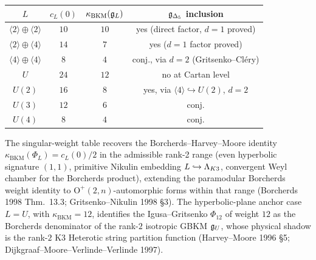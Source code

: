 \begin{center}
\begin{tabular}{c|c|c|c}
$L$ & $c_L(0)$ & $\kappa_{\mathrm{BKM}}(\mathfrak{g}_L)$ & $\mathfrak{g}_{\Delta_5}$ inclusion \\
\hline
$\langle 2 \rangle \oplus \langle 2 \rangle$ & $10$ & $10$ & yes (direct factor, $d=1$ proved) \\
$\langle 2 \rangle \oplus \langle 4 \rangle$ & $14$ & $7$ & yes ($d=1$ factor proved) \\
$\langle 4 \rangle \oplus \langle 4 \rangle$ & $8$ & $4$ & conj., via $d=2$ (Gritsenko--Cl\'ery) \\
$U$ & $24$ & $12$ & no at Cartan level \\
$U(2)$ & $16$ & $8$ & yes, via $\langle 4 \rangle \hookrightarrow U(2)$, $d=2$ \\
$U(3)$ & $12$ & $6$ & conj. \\
$U(4)$ & $8$ & $4$ & conj. \\
\end{tabular}
\end{center}

The singular-weight table recovers the Borcherds--Harvey--Moore identity
$\kappa_{\mathrm{BKM}}(\Phi_L) = c_L(0) / 2$ in the admissible rank-2 range
(even hyperbolic signature $(1,1)$, primitive Nikulin embedding
$L \hookrightarrow \Lambda_{K3}$, convergent Weyl chamber for the Borcherds product),
extending the paramodular Borcherds weight identity to
$\mathrm{O}^+(2, n)$-automorphic forms within that range
(Borcherds 1998 Thm.~13.3; Gritsenko--Nikulin 1998 \S3). The
hyperbolic-plane anchor case $L = U$, with $\kappa_{\mathrm{BKM}} = 12$,
identifies the Igusa--Gritsenko $\Phi_{12}$ of weight $12$ as the
Borcherds denominator of the rank-$2$ isotropic GBKM $\mathfrak{g}_U$, whose
physical shadow is the rank-$2$ K3 Heterotic string partition function
(Harvey--Moore 1996 \S5; Dijkgraaf--Moore--Verlinde--Verlinde 1997).
